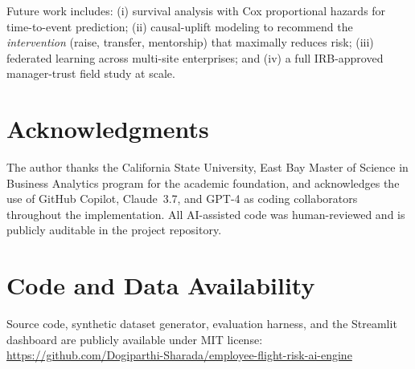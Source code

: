 \documentclass[conference]{IEEEtran}
\begin{document}
Future work includes: (i) survival analysis with Cox proportional
hazards for time-to-event prediction; (ii) causal-uplift modeling
to recommend the \emph{intervention} (raise, transfer, mentorship)
that maximally reduces risk; (iii) federated learning across
multi-site enterprises; and (iv) a full IRB-approved manager-trust
field study at scale.

\section*{Acknowledgments}
The author thanks the California State University, East Bay
Master of Science in Business Analytics program for the academic
foundation, and acknowledges the use of GitHub Copilot,
Claude~3.7, and GPT-4 as coding collaborators throughout the
implementation. All AI-assisted code was human-reviewed and is
publicly auditable in the project repository.

\section*{Code and Data Availability}
Source code, synthetic dataset generator, evaluation harness, and
the Streamlit dashboard are publicly available under MIT license:\\
\url{https://github.com/Dogiparthi-Sharada/employee-flight-risk-ai-engine}
\end{document}
